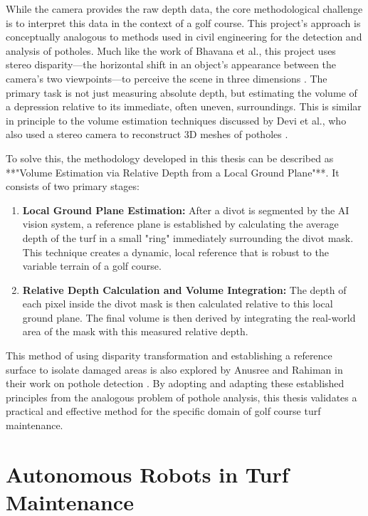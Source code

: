 While the camera provides the raw depth data, the core methodological challenge is to interpret this data in the context of a golf course. This project's approach is conceptually analogous to methods used in civil engineering for the detection and analysis of potholes. Much like the work of Bhavana et al., this project uses stereo disparity—the horizontal shift in an object's appearance between the camera's two viewpoints—to perceive the scene in three dimensions \cite{bhavana2023comprehensive}. The primary task is not just measuring absolute depth, but estimating the volume of a depression relative to its immediate, often uneven, surroundings. This is similar in principle to the volume estimation techniques discussed by Devi et al., who also used a stereo camera to reconstruct 3D meshes of potholes \cite{devi2019computer}.

To solve this, the methodology developed in this thesis can be described as **"Volume Estimation via Relative Depth from a Local Ground Plane"**. It consists of two primary stages:
\begin{enumerate}
    \item \textbf{Local Ground Plane Estimation:} After a divot is segmented by the AI vision system, a reference plane is established by calculating the average depth of the turf in a small "ring" immediately surrounding the divot mask. This technique creates a dynamic, local reference that is robust to the variable terrain of a golf course.
    \item \textbf{Relative Depth Calculation and Volume Integration:} The depth of each pixel inside the divot mask is then calculated relative to this local ground plane. The final volume is then derived by integrating the real-world area of the mask with this measured relative depth.
\end{enumerate}

This method of using disparity transformation and establishing a reference surface to isolate damaged areas is also explored by Anusree and Rahiman in their work on pothole detection \cite{anusree2021pothole}. By adopting and adapting these established principles from the analogous problem of pothole analysis, this thesis validates a practical and effective method for the specific domain of golf course turf maintenance.


\section{Autonomous Robots in Turf Maintenance}
\label{sec:lit_turf_robots}

